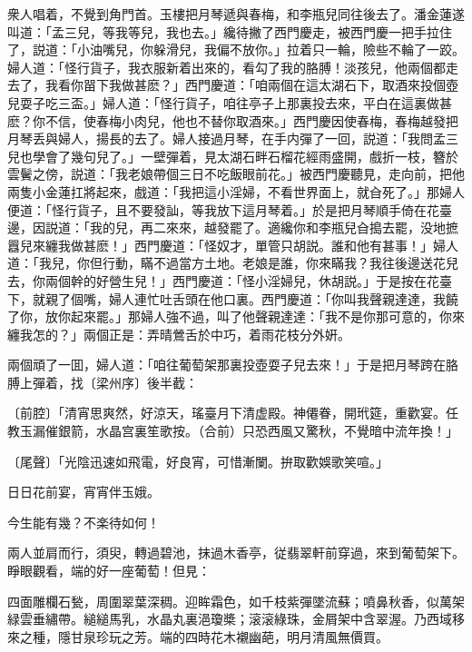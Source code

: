 衆人唱着，不覺到角門首。玉樓把月琴遞與春梅，和李瓶兒同往後去了。潘金蓮遂叫道：「孟三兒，等我等兒，我也去。」纔待撇了西門慶走，被西門慶一把手拉住了，説道：「小油嘴兒，你躲滑兒，我偏不放你。」拉着只一輪，險些不輪了一跤。婦人道：「怪行貨子，我衣服新着出來的，看勾了我的胳膊！淡孩兒，他兩個都走去了，我看你㽞下我做甚麽？」西門慶道：「咱兩個在這太湖石下，取酒來投個壺兒耍子吃三盃。」婦人道：「怪行貨子，咱往亭子上那裏投去來，平白在這裏做甚麽？你不信，使春梅小肉兒，他也不替你取酒來。」西門慶因使春梅，春梅越發把月琴丢與婦人，揚長的去了。婦人接過月琴，在手内彈了一回，説道：「我問孟三兒也學會了幾句兒了。」一壁彈着，見太湖石畔石榴花經雨盛開，戲折一枝，簪於雲鬢之傍，説道：「我老娘帶個三日不吃飯眼前花。」被西門慶聽見，走向前，把他兩隻小金蓮扛將起來，戲道：「我把這小淫婦，不看世界面上，就㒲死了。」那婦人便道：「怪行貨子，且不要發訕，等我放下這月琴着。」於是把月琴順手倚在花臺邊，因説道：「我的兒，再二來來，越發罷了。適纔你和李瓶兒㒲搗去罷，没地摭囂兒來纏我做甚麽！」西門慶道：「怪奴才，單管只胡説。誰和他有甚事！」婦人道：「我兒，你但行動，瞞不過當方土地。老娘是誰，你來瞞我？我往後邊送花兒去，你兩個幹的好營生兒！」西門慶道：「怪小淫婦兒，休胡説。」于是按在花臺下，就親了個嘴，婦人連忙吐舌頭在他口裏。西門慶道：「你叫我聲親達達，我饒了你，放你起來罷。」那婦人強不過，叫了他聲親達達：「我不是你那可意的，你來纏我怎的？」兩個正是：弄晴鶯舌於中巧，着雨花枝分外姸。

兩個頑了一囬，婦人道：「咱往葡萄架那裏投壺耍子兒去來！」于是把月琴跨在胳膊上彈着，找〔梁州序〕後半截：

\begin{myquote}
{\markfont〔前腔〕}「清宵思爽然，好涼天，瑤臺月下清虚殿。神僊眷，開玳筵，重歡宴。任教玉漏催銀箭，水晶宫裏笙歌按。{\marktext（合前）}只恐西風又驚秋，不覺暗中流年換！」

{\markfont〔尾聲〕}「光陰迅速如飛電，好良宵，可惜漸闌。拚取歡娛歌笑喧。」
\end{myquote}

\begin{myquote}
日日花前宴，宵宵伴玉娥。

今生能有幾？不楽待如何！　
\end{myquote}

兩人並肩而行，須臾，轉過碧池，抹過木香亭，従翡翠軒前穿過，來到葡萄架下。睜眼觀看，端的好一座葡萄！但見：

四面雕欄石甃，周圍翠葉深稠。迎眸霜色，如千枝紫彈墜流蘇；噴鼻秋香，似萬架緑雲垂繡帶。縋縋馬乳，水晶丸裏浥瓊槳；滚滚綠珠，金屑架中含翠渥。乃西域移來之種，隱甘泉珍玩之芳。端的四時花木襯幽葩，明月清風無價買。

